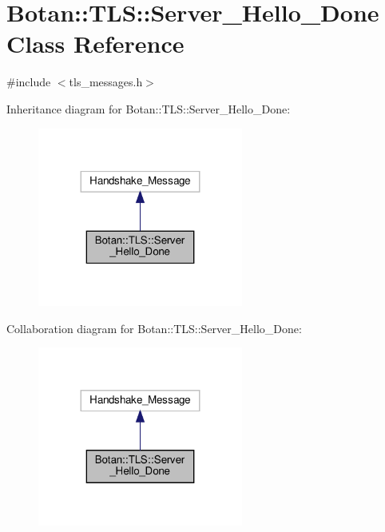 \hypertarget{class_botan_1_1_t_l_s_1_1_server___hello___done}{}\section{Botan\+:\+:T\+LS\+:\+:Server\+\_\+\+Hello\+\_\+\+Done Class Reference}
\label{class_botan_1_1_t_l_s_1_1_server___hello___done}


{\ttfamily \#include $<$tls\+\_\+messages.\+h$>$}



Inheritance diagram for Botan\+:\+:T\+LS\+:\+:Server\+\_\+\+Hello\+\_\+\+Done\+:
\nopagebreak
\begin{figure}[H]
\begin{center}
\leavevmode
\includegraphics[width=191pt]{class_botan_1_1_t_l_s_1_1_server___hello___done__inherit__graph}
\end{center}
\end{figure}


Collaboration diagram for Botan\+:\+:T\+LS\+:\+:Server\+\_\+\+Hello\+\_\+\+Done\+:
\nopagebreak
\begin{figure}[H]
\begin{center}
\leavevmode
\includegraphics[width=191pt]{class_botan_1_1_t_l_s_1_1_server___hello___done__coll__graph}
\end{center}
\end{figure}
